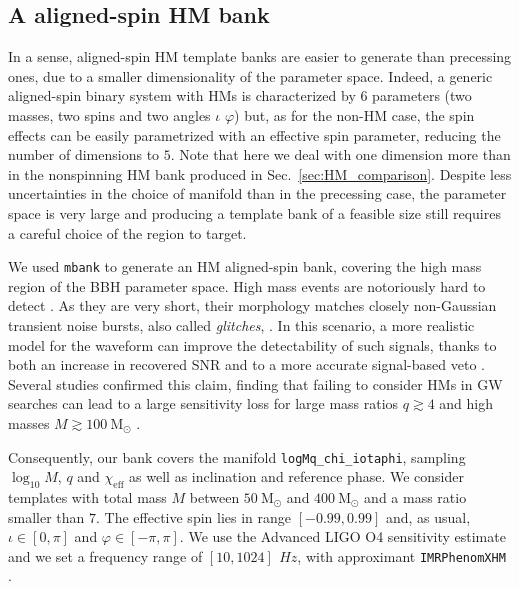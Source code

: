 \documentclass[twocolumn,showpacs,preprintnumbers,nofootinbib,prd,
superscriptaddress,10pt]{revtex4-2}
\begin{document}

\subsection{A aligned-spin HM bank} \label{sec:HM_spinning_bank}

In a sense, aligned-spin HM template banks are easier to generate than precessing ones, due to a smaller dimensionality of the parameter space. Indeed, a generic aligned-spin binary system with HMs is characterized by $6$ parameters (two masses, two spins and two angles $\iota$ $\varphi$) but, as for the non-HM case, the spin effects can be easily parametrized with an effective spin parameter, reducing the number of dimensions to $5$.
Note that here we deal with one dimension more than in the nonspinning HM bank produced in Sec.~\ref{sec:HM_comparison}.
Despite less uncertainties in the choice of manifold than in the precessing case, the parameter space is very large and producing a template bank of a feasible size still requires a careful choice of the region to target.

We used \texttt{mbank} to generate an HM aligned-spin bank, covering the high mass region of the BBH parameter space.
High mass events are notoriously hard to detect \cite{LIGOScientific:2021tfm, Chandra:2021wbw}. As they are very short, their morphology matches closely non-Gaussian transient noise bursts, also called {\it glitches}, \cite{Blackburn:2008ah, Zevin:2016qwy, LIGOScientific:2016gtq, LIGO:2021ppb}. In this scenario, a more realistic model for the waveform can improve the detectability of such signals, thanks to both an increase in recovered SNR and to a more accurate signal-based veto \cite{Babak:2005kv, PhysRevD.95.042001}.
Several studies \cite{Pekowsky:2012sr, Capano:2013raa, Varma:2014jxa, CalderonBustillo:2015lrt} confirmed this claim, finding that failing to consider HMs in GW searches can lead to a large sensitivity loss for large mass ratios $q\gtrsim 4$ and high masses $M \gtrsim \SI{100}{\mathrm{M_\odot}}$ \cite{CalderonBustillo:2016rlt}.

Consequently, our bank covers the manifold \texttt{logMq\_chi\_iotaphi}, sampling $\log_{10}M$, $q$ and $\chi_\text{eff}$ as well as inclination and reference phase.
We consider templates with total mass $M$ between $\SI{50}{\mathrm{M_\odot}}$ and $\SI{400}{\mathrm{M_\odot}}$ and a mass ratio smaller than $7$. The effective spin lies in range $[-0.99, 0.99]$ and, as usual, $\iota \in [0, \pi]$ and $\varphi \in [-\pi, \pi]$.
We use the Advanced LIGO O4 sensitivity estimate \cite{O4_PSDs} and we set a frequency range of $[10, 1024]\,\SI{}{Hz}$, with approximant \texttt{IMRPhenomXHM} \cite{Garcia-Quiros:2020qpx}.
\end{document}

